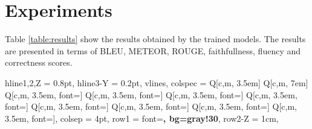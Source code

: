 \section{Experiments}
Table \ref{table:results} show the results obtained by the trained models. The results are presented in terms of BLEU, METEOR, ROUGE, faithfullness, fluency and correctness scores. 
\begin{table}[H]
    \begin{adjustwidth}{-6em}{}
    \begin{tblr}{hline{1,2,Z} = 0.8pt, hline{3-Y} = 0.2pt, vlines,
                 colspec = {Q[c,m, 3.5em] Q[c,m, 7em] Q[c,m, 3.5em, font=] Q[c,m, 3.5em, font=] Q[c,m, 3.5em, font=] Q[c,m, 3.5em, font=] Q[c,m, 3.5em, font=] Q[c,m, 3.5em, font=] Q[c,m, 3.5em, font=] Q[c,m, 3.5em, font=]},
                 colsep  = 4pt,
                 row{1}  = {font=\bfseries, bg=gray!30},
                 row{2-Z} = {1cm},
                 }
    

\end{tblr}
\end{adjustwidth}
\end{table}
